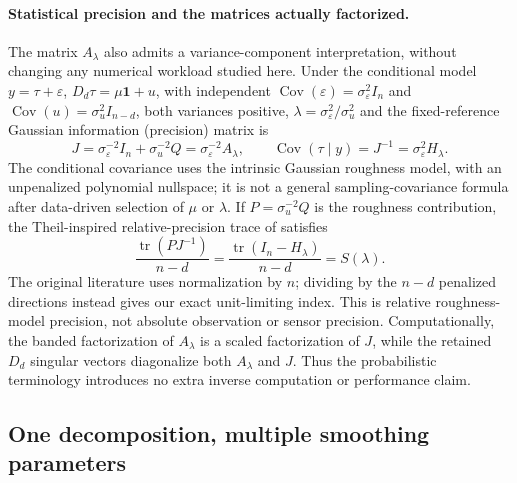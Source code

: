 \paragraph{Statistical precision and the matrices actually factorized.}
The matrix $A_\lambda$ also admits a variance-component interpretation,
without changing any numerical workload studied here. Under the
conditional model $y=\tau+\varepsilon$,
$D_d\tau=\mu\mathbf1+u$, with independent
$\operatorname{Cov}(\varepsilon)=\sigma_\varepsilon^2I_n$ and
$\operatorname{Cov}(u)=\sigma_u^2I_{n-d}$, both variances positive,
$\lambda=\sigma_\varepsilon^2/\sigma_u^2$ and the
fixed-reference Gaussian information (precision) matrix is
\begin{equation}\label{eq:empirical-precision}
J=\sigma_\varepsilon^{-2}I_n+
  \sigma_u^{-2}Q
 =\sigma_\varepsilon^{-2}A_\lambda,\qquad
\operatorname{Cov}(\tau\mid y)=J^{-1}
 =\sigma_\varepsilon^2H_\lambda.
\end{equation}
The conditional covariance uses the intrinsic Gaussian
roughness model, with an unpenalized polynomial nullspace;
it is not a general sampling-covariance formula after
data-driven selection of $\mu$ or $\lambda$.
If $P=\sigma_u^{-2}Q$ is the roughness contribution,
the Theil-inspired relative-precision trace of
\citet{guerrero2007penalized,cortes2017smoothness} satisfies
\begin{equation}\label{eq:empirical-relative-precision}
\frac{\operatorname{tr}(PJ^{-1})}{n-d}
 =\frac{\operatorname{tr}(I_n-H_\lambda)}{n-d}
 =S(\lambda).
\end{equation}
The original literature uses normalization by $n$; dividing
by the $n-d$ penalized directions instead gives our exact
unit-limiting index. This is relative roughness-model
precision, not absolute observation or sensor precision.
Computationally, the banded factorization of $A_\lambda$
is a scaled factorization of $J$, while the retained
$D_d$ singular vectors diagonalize both $A_\lambda$ and $J$.
Thus the probabilistic terminology introduces no extra
inverse computation or performance claim.


\subsection{One decomposition, multiple smoothing parameters}
